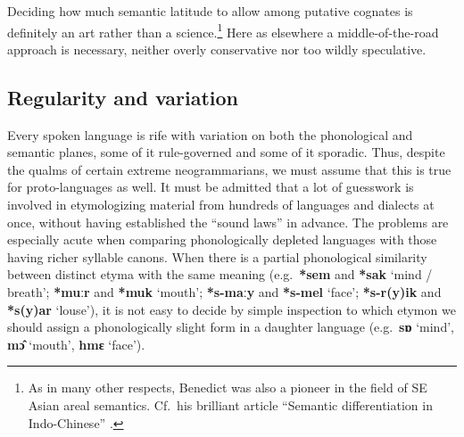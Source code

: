 Deciding how much semantic latitude to allow among putative cognates is
definitely an art rather than a science.\footnote{As in many other respects, Benedict was also a pioneer in the field of SE Asian areal semantics. Cf.\ his brilliant article “Semantic differentiation in Indo-Chinese” \citeyearpar{PKB-SDIC}.} Here as elsewhere a middle-of-the-road
approach is necessary, neither overly conservative nor too wildly speculative.



\subsection{Regularity and variation}

Every spoken language is rife with variation on both the phonological and semantic planes, some of it rule-governed and some of it sporadic. Thus, despite the qualms of certain extreme neogrammarians, we must assume that this is true for proto-languages as well. It must be admitted that a lot of guesswork is involved in etymologizing
material from hundreds of languages and dialects at once, without having
established the “sound laws” in advance. The problems are especially acute when
comparing phonologically depleted languages with those having richer syllable
canons. When there is a partial phonological similarity between distinct etyma
with the same meaning (e.g.\ \textbf{*sem} and \textbf{*sak}  ‘mind / breath’;
\textbf{*muːr} and \textbf{*muk}
‘mouth’; \textbf{*s-maːy} and \textbf{*s-mel} ‘face’;
\textbf{*s-r(y)ik} and \textbf{*s(y)ar} ‘louse’), it is not
easy to decide by simple inspection to which etymon we should assign a
phonologically slight form in a daughter language (e.g.\ \textbf{sɒ} ‘mind’,
\textbf{mɔ̂} ‘mouth’,
\textbf{hmɛ} ‘face’).


